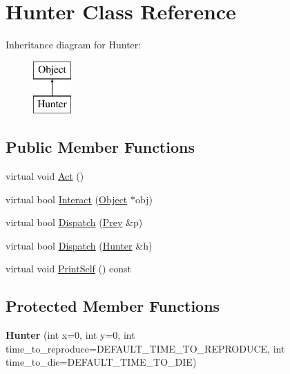 \hypertarget{classHunter}{
\section{Hunter Class Reference}
\label{classHunter}
}
Inheritance diagram for Hunter:\begin{figure}[H]
\begin{center}
\leavevmode
\includegraphics[height=2cm]{classHunter}
\end{center}
\end{figure}
\subsection*{Public Member Functions}
\begin{DoxyCompactItemize}
\item 
virtual void \hyperlink{classHunter_ac8bed4eeb2bfebcf7df72ba7359ac204}{Act} ()
\item 
virtual bool \hyperlink{classHunter_aad1bd13407503496a74ae1a6c689e64f}{Interact} (\hyperlink{classObject}{Object} $\ast$obj)
\item 
virtual bool \hyperlink{classHunter_ac37d719ac6068a9b3a72650fd4034ad4}{Dispatch} (\hyperlink{classPrey}{Prey} \&p)
\item 
virtual bool \hyperlink{classHunter_a3c9a7768f590ef9031b52ae58b5216a6}{Dispatch} (\hyperlink{classHunter}{Hunter} \&h)
\item 
virtual void \hyperlink{classHunter_a9b193792622fd203df15bf755753e9bd}{PrintSelf} () const 
\end{DoxyCompactItemize}
\subsection*{Protected Member Functions}
\begin{DoxyCompactItemize}
\item 
\hypertarget{classHunter_a24cf0cbb9ca4df6886bcdff91c2aa9a2}{
{\bfseries Hunter} (int x=0, int y=0, int time\_\-to\_\-reproduce=DEFAULT\_\-TIME\_\-TO\_\-REPRODUCE, int time\_\-to\_\-die=DEFAULT\_\-TIME\_\-TO\_\-DIE)}
\label{classHunter_a24cf0cbb9ca4df6886bcdff91c2aa9a2}

\end{DoxyCompactItemize}
